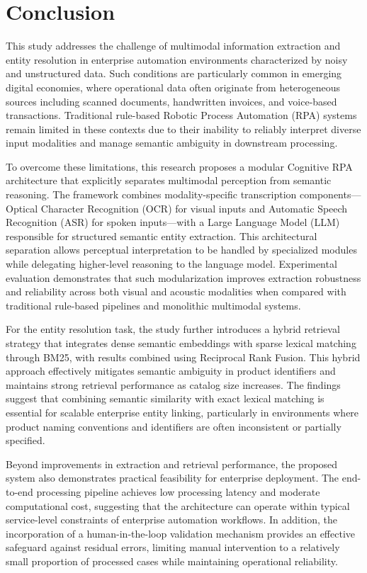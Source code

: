 \section{Conclusion}

This study addresses the challenge of multimodal information extraction and entity resolution in enterprise automation environments characterized by noisy and unstructured data. Such conditions are particularly common in emerging digital economies, where operational data often originate from heterogeneous sources including scanned documents, handwritten invoices, and voice-based transactions. Traditional rule-based Robotic Process Automation (RPA) systems remain limited in these contexts due to their inability to reliably interpret diverse input modalities and manage semantic ambiguity in downstream processing.

To overcome these limitations, this research proposes a modular Cognitive RPA architecture that explicitly separates multimodal perception from semantic reasoning. The framework combines modality-specific transcription components—Optical Character Recognition (OCR) for visual inputs and Automatic Speech Recognition (ASR) for spoken inputs—with a Large Language Model (LLM) responsible for structured semantic entity extraction. This architectural separation allows perceptual interpretation to be handled by specialized modules while delegating higher-level reasoning to the language model. Experimental evaluation demonstrates that such modularization improves extraction robustness and reliability across both visual and acoustic modalities when compared with traditional rule-based pipelines and monolithic multimodal systems.

For the entity resolution task, the study further introduces a hybrid retrieval strategy that integrates dense semantic embeddings with sparse lexical matching through BM25, with results combined using Reciprocal Rank Fusion. This hybrid approach effectively mitigates semantic ambiguity in product identifiers and maintains strong retrieval performance as catalog size increases. The findings suggest that combining semantic similarity with exact lexical matching is essential for scalable enterprise entity linking, particularly in environments where product naming conventions and identifiers are often inconsistent or partially specified.

Beyond improvements in extraction and retrieval performance, the proposed system also demonstrates practical feasibility for enterprise deployment. The end-to-end processing pipeline achieves low processing latency and moderate computational cost, suggesting that the architecture can operate within typical service-level constraints of enterprise automation workflows. In addition, the incorporation of a human-in-the-loop validation mechanism provides an effective safeguard against residual errors, limiting manual intervention to a relatively small proportion of processed cases while maintaining operational reliability.

